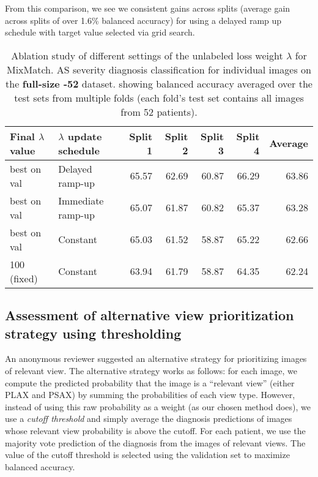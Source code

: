 From this comparison, we see we consistent gains across splits (average gain across splits of over 1.6\% balanced accuracy) for using a delayed ramp up schedule with target value selected via grid search.

\begin{table}[!h]
    \centering
    \begin{tabular}{l l| rrrr | r}
    Final $\lambda$ value & $\lambda$ update schedule & Split 1  & Split 2 & Split 3 & Split 4 & Average\\
    \hline
    best on val & Delayed ramp-up  & 65.57 & 62.69 & 60.87 & 66.29 & 63.86\\
    best on val & Immediate ramp-up & 65.07 & 61.87 & 60.82 & 65.37 & 63.28\\
    best on val & Constant  & 65.03 & 61.52 & 58.87 & 65.22 & 62.66\\
    100 (fixed) & Constant & 63.94 & 61.79 & 58.87 & 64.35 & 62.24\\
    \end{tabular}
    \caption{Ablation study of different settings of the unlabeled loss weight $\lambda$ for MixMatch. AS severity diagnosis classification for individual images on the \textbf{full-size -52} dataset. showing balanced accuracy averaged over the test sets from multiple folds (each fold’s test set contains all images from 52 patients). }%
    \label{tab:MixMatch hyperparameters ablation study}
\end{table}



\subsection{Assessment of alternative view prioritization strategy using thresholding}


An anonymous reviewer suggested an alternative strategy for prioritizing images of relevant view.
The alternative strategy works as follows: for each image, we compute the predicted probability that the image is a ``relevant view'' (either PLAX and PSAX) by summing the probabilities of each view type.
However, instead of using this raw probability as a weight (as our chosen method does), we use a \emph{cutoff threshold} and simply average the diagnosis predictions of images whose relevant view probability is above the cutoff.
For each patient, we use the majority vote prediction of the diagnosis from the images of relevant views.
The value of the cutoff threshold is selected using the validation set to maximize balanced accuracy.

